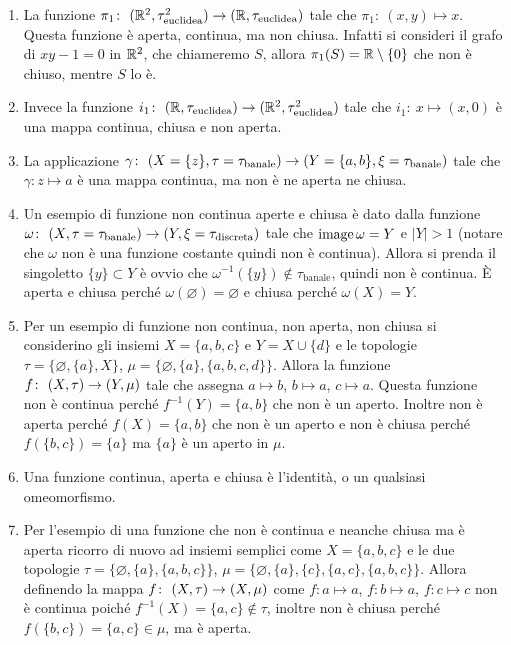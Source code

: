 \begin{example}
\begin{enumerate}
	\item La funzione $\pi_1 \colon\ (\mathbb{R}^2,\tau^2_{\text{euclidea}}) \rightarrow (\mathbb{R},\tau_{\text{euclidea}})$ tale che $\pi_1 \colon\ (x,y) \mapsto x$. Questa funzione è aperta, continua, ma non chiusa. Infatti si consideri il grafo di $xy - 1 = 0$ in $\mathbb{R}^2$, che chiameremo $S$, allora $\pi_1(S) = \mathbb{R} \setminus \{0\}$ che non è chiuso, mentre $S$ lo è.
	\item Invece la funzione $i_1 \colon\ (\mathbb{R},\tau_{\text{euclidea}}) \rightarrow (\mathbb{R}^2,\tau^2_{\text{euclidea}})$ tale che $i_1 \colon\ x \mapsto (x,0)$ è una mappa continua, chiusa e non aperta. 
	\item La applicazione $\gamma \colon\ (X = \{z\},\tau =\tau_{\text{banale}}) \rightarrow (Y = \{a,b\},\xi = \tau_{\text{banale}})$ tale che  $\gamma \colon z \mapsto a$ è una mappa continua, ma non è ne aperta ne chiusa.
	\item Un esempio di funzione non continua aperte e chiusa è dato dalla funzione $\omega \colon\ (X,\tau =\tau_{\text{banale}}) \rightarrow (Y,\xi = \tau_{\text{discreta}})$ tale che $\operatorname{image}{\omega} = Y$ e $|Y| > 1$ (notare che $\omega$ non è una funzione costante quindi non è continua). Allora si prenda il singoletto $\{y\} \subset Y$ è ovvio che $\omega^{-1}(\{y\}) \notin \tau_{\text{banale}}$, quindi non è continua. È aperta e chiusa perché $\omega(\varnothing) = \varnothing$ e chiusa perché $\omega(X) = Y$.
	\item Per un esempio di funzione non continua, non aperta, non chiusa si considerino gli insiemi $X = \{a,b,c\}$ e $Y = X \cup \{d\}$ e le topologie $\tau = \{\varnothing, \{a\}, X\}$, $\mu = \{ \varnothing, \{a\}, \{a,b,c,d\}\}$. Allora la funzione $f \colon\ (X,\tau) \rightarrow (Y,\mu)$ tale che assegna $a \mapsto b$, $b \mapsto a$, $c \mapsto a$. Questa funzione non è continua perché $f^{-1}(Y) = \{a,b\}$ che non è un aperto. Inoltre non è aperta perché $f(X) = \{a,b\}$ che non è un aperto e non è chiusa perché $f(\{b,c\}) = \{a\}$ ma $\{a\}$ è un aperto in $\mu$.
	\item Una funzione continua, aperta e chiusa è l'identità, o un qualsiasi omeomorfismo.
	\item Per l'esempio di una funzione che non è continua e neanche chiusa ma è aperta ricorro di nuovo ad insiemi semplici come $X = \{a,b,c\}$ e le due topologie $\tau = \{\varnothing, \{a\},\{a,b,c\}\}$, $\mu = \{\varnothing, \{a\}, \{c\}, \{a,c\}, \{a,b,c\}\}$. Allora definendo la mappa $f \colon\ (X,\tau) \rightarrow (X,\mu)$ come $f \colon a \mapsto a$, $f \colon b \mapsto a$, $f \colon c \mapsto c$ non è continua poiché $f^{-1}(X) = \{a,c\} \notin \tau$, inoltre non è chiusa perché $f(\{b,c\}) = \{a,c\} \in \mu$, ma è aperta.\\

\end{enumerate}
\end{example}
